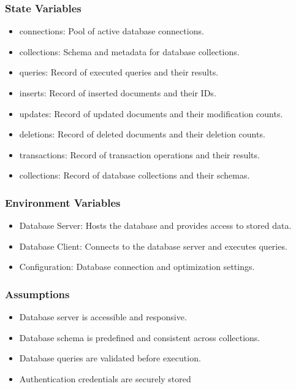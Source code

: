 \documentclass[12pt, titlepage]{article}
\begin{document}
\subsubsection{State Variables}
\begin{itemize}
    \item connections: Pool of active database connections.
    \item collections: Schema and metadata for database collections.
    \item queries: Record of executed queries and their results.
    \item inserts: Record of inserted documents and their IDs.
    \item updates: Record of updated documents and their modification counts.
    \item deletions: Record of deleted documents and their deletion counts.
    \item transactions: Record of transaction operations and their results.
    \item collections: Record of database collections and their schemas.
\end{itemize}

\subsubsection{Environment Variables}
\begin{itemize}
    \item Database Server: Hosts the database and provides access to stored data.
    \item Database Client: Connects to the database server and executes queries.
    \item Configuration: Database connection and optimization settings.
\end{itemize}

\subsubsection{Assumptions}
\begin{itemize}
    \item Database server is accessible and responsive.
    \item Database schema is predefined and consistent across collections.
    \item Database queries are validated before execution.
    \item Authentication credentials are securely stored
\end{itemize}
\end{document}
